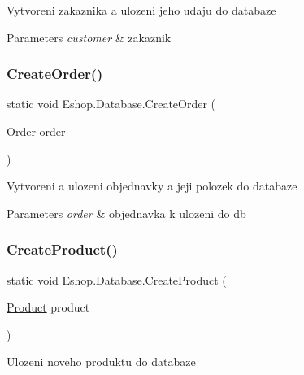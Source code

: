 Vytvoreni zakaznika a ulozeni jeho udaju do databaze 


\begin{DoxyParams}{Parameters}
{\em customer} & zakaznik\\
\hline
\end{DoxyParams}
\mbox{\label{class_eshop_1_1_database_a4faa9a3bc15b629843563b35f8c2ea89}} 
\subsubsection{\texorpdfstring{CreateOrder()}{CreateOrder()}}
{\footnotesize\ttfamily static void Eshop.\+Database.\+Create\+Order (\begin{DoxyParamCaption}\item[{\mbox{\hyperlink{class_eshop_1_1_order}{Order}}}]{order }\end{DoxyParamCaption})\hspace{0.3cm}{\ttfamily [static]}}



Vytvoreni a ulozeni objednavky a jeji polozek do databaze 


\begin{DoxyParams}{Parameters}
{\em order} & objednavka k ulozeni do db\\
\hline
\end{DoxyParams}
\mbox{\label{class_eshop_1_1_database_a9b42824ae9bc2e583a589b031f37f457}} 
\subsubsection{\texorpdfstring{CreateProduct()}{CreateProduct()}}
{\footnotesize\ttfamily static void Eshop.\+Database.\+Create\+Product (\begin{DoxyParamCaption}\item[{\mbox{\hyperlink{class_eshop_1_1_product}{Product}}}]{product }\end{DoxyParamCaption})\hspace{0.3cm}{\ttfamily [static]}}



Ulozeni noveho produktu do databaze 



